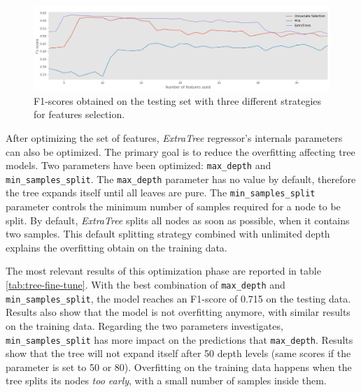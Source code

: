 \begin{figure}[htbp]
    \centering
    \includegraphics[width=15cm]{images/feature_selection.png}
    \caption[F1-scores based on feature selection]{F1-scores obtained on the testing set with three different strategies for features selection.}
    \label{fig:feature-selection}
\end{figure}


After optimizing the set of features, \textit{ExtraTree} regressor's internals parameters can also be optimized. The primary goal is to reduce the overfitting affecting tree models. Two parameters have been optimized: \texttt{max\_depth} and \texttt{min\_samples\_split}. The \texttt{max\_depth} parameter has no value by default, therefore the tree expands itself until all leaves are pure. The \texttt{min\_samples\_split} parameter controls the minimum number of samples required for a node to be split. By default, \textit{ExtraTree} splits all nodes as soon as possible, when it contains two samples. This default splitting strategy combined with unlimited depth explains the overfitting obtain on the training data.

The most relevant results of this optimization phase are reported in table \ref{tab:tree-fine-tune}. With the best combination of \texttt{max\_depth} and \texttt{min\_samples\_split}, the model reaches an F1-score of 0.715 on the testing data. Results also show that the model is not overfitting anymore, with similar results on the training data. Regarding the two parameters investigates, \texttt{min\_samples\_split} has more impact on the predictions that \texttt{max\_depth}. Results show that the tree will not expand itself after 50 depth levels (same scores if the parameter is set to 50 or 80). Overfitting on the training data happens when the tree splits its nodes \textit{too early}, with a small number of samples inside them.


